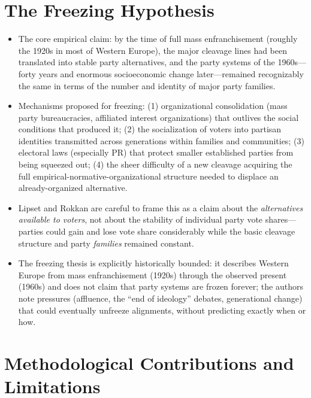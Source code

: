 \documentclass[12pt]{article}
\begin{document}
\section{The Freezing Hypothesis}

\begin{itemize}[leftmargin=*, itemsep=4pt]
    \item The core empirical claim: by the time of full mass enfranchisement (roughly the 1920s in most of Western Europe), the major cleavage lines had been translated into stable party alternatives, and the party systems of the 1960s---forty years and enormous socioeconomic change later---remained recognizably the same in terms of the number and identity of major party families.
    \item Mechanisms proposed for freezing: (1) organizational consolidation (mass party bureaucracies, affiliated interest organizations) that outlives the social conditions that produced it; (2) the socialization of voters into partisan identities transmitted across generations within families and communities; (3) electoral laws (especially PR) that protect smaller established parties from being squeezed out; (4) the sheer difficulty of a new cleavage acquiring the full empirical-normative-organizational structure needed to displace an already-organized alternative.
    \item Lipset and Rokkan are careful to frame this as a claim about the \emph{alternatives available to voters}, not about the stability of individual party vote shares---parties could gain and lose vote share considerably while the basic cleavage structure and party \emph{families} remained constant.
    \item The freezing thesis is explicitly historically bounded: it describes Western Europe from mass enfranchisement (1920s) through the observed present (1960s) and does not claim that party systems are frozen forever; the authors note pressures (affluence, the ``end of ideology'' debates, generational change) that could eventually unfreeze alignments, without predicting exactly when or how.
\end{itemize}

\section{Methodological Contributions and Limitations}
\end{document}
